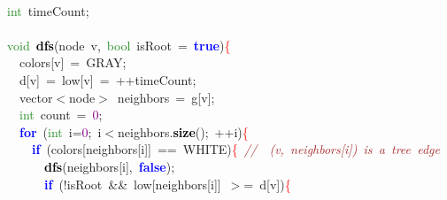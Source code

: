 \documentclass[10pt,a4paper,twoside]{article}
\begin{document}
{{{{{{{{\mbox{} \\
\mbox{}\textcolor{ForestGreen}{int}\ timeCount\textcolor{BrickRed}{;} \\
\mbox{} \\
\mbox{}\textcolor{ForestGreen}{void}\ \textbf{\textcolor{Black}{dfs}}\textcolor{BrickRed}{(}node\ v\textcolor{BrickRed}{,}\ \textcolor{ForestGreen}{bool}\ isRoot\ \textcolor{BrickRed}{=}\ \textbf{\textcolor{Blue}{true}}\textcolor{BrickRed}{)}\textcolor{Red}{\{} \\
\mbox{}\ \ colors\textcolor{BrickRed}{[}v\textcolor{BrickRed}{]}\ \textcolor{BrickRed}{=}\ GRAY\textcolor{BrickRed}{;} \\
\mbox{}\ \ d\textcolor{BrickRed}{[}v\textcolor{BrickRed}{]}\ \textcolor{BrickRed}{=}\ low\textcolor{BrickRed}{[}v\textcolor{BrickRed}{]}\ \textcolor{BrickRed}{=}\ \textcolor{BrickRed}{++}timeCount\textcolor{BrickRed}{;} \\
\mbox{}\ \ vector\textcolor{BrickRed}{$<$}node\textcolor{BrickRed}{$>$}\ neighbors\ \textcolor{BrickRed}{=}\ g\textcolor{BrickRed}{[}v\textcolor{BrickRed}{];} \\
\mbox{}\ \ \textcolor{ForestGreen}{int}\ count\ \textcolor{BrickRed}{=}\ \textcolor{Purple}{0}\textcolor{BrickRed}{;} \\
\mbox{}\ \ \textbf{\textcolor{Blue}{for}}\ \textcolor{BrickRed}{(}\textcolor{ForestGreen}{int}\ i\textcolor{BrickRed}{=}\textcolor{Purple}{0}\textcolor{BrickRed}{;}\ i\textcolor{BrickRed}{$<$}neighbors\textcolor{BrickRed}{.}\textbf{\textcolor{Black}{size}}\textcolor{BrickRed}{();}\ \textcolor{BrickRed}{++}i\textcolor{BrickRed}{)}\textcolor{Red}{\{} \\
\mbox{}\ \ \ \ \textbf{\textcolor{Blue}{if}}\ \textcolor{BrickRed}{(}colors\textcolor{BrickRed}{[}neighbors\textcolor{BrickRed}{[}i\textcolor{BrickRed}{]]}\ \textcolor{BrickRed}{==}\ WHITE\textcolor{BrickRed}{)}\textcolor{Red}{\{}\ \textit{\textcolor{Brown}{//\ \ (v,\ neighbors[i])\ is\ a\ tree\ edge}} \\
\mbox{}\ \ \ \ \ \ \textbf{\textcolor{Black}{dfs}}\textcolor{BrickRed}{(}neighbors\textcolor{BrickRed}{[}i\textcolor{BrickRed}{],}\ \textbf{\textcolor{Blue}{false}}\textcolor{BrickRed}{);} \\
\mbox{}\ \ \ \ \ \ \textbf{\textcolor{Blue}{if}}\ \textcolor{BrickRed}{(!}isRoot\ \textcolor{BrickRed}{\&\&}\ low\textcolor{BrickRed}{[}neighbors\textcolor{BrickRed}{[}i\textcolor{BrickRed}{]]}\ \textcolor{BrickRed}{$>$=}\ d\textcolor{BrickRed}{[}v\textcolor{BrickRed}{])}\textcolor{Red}{\{} \\
}}}}}}}}
\end{document}
